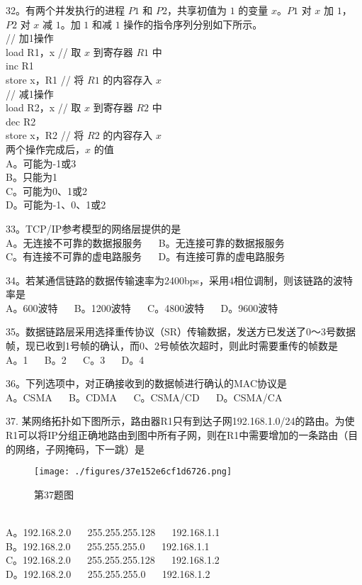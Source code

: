32。有两个并发执行的进程 $P1$ 和 $P2$，共享初值为 $1$ 的变量 $x$。$P1$ 对 $x$ 加 $1$，$P2$ 对 $x$ 减 $1$。加 $1$ 和减 $1$ 操作的指令序列分别如下所示。 \\

// 加1操作 \\
load R1，x  // 取 $x$ 到寄存器 $R1$ 中 \\
inc R1 \\
store x，R1  // 将 $R1$ 的内容存入 $x$ \\

// 减1操作 \\
load R2，x // 取 $x$ 到寄存器 $R2$ 中 \\
dec R2 \\
store x，R2 // 将 $R2$ 的内容存入 $x$ \\

两个操作完成后，$x$ 的值 \\
A。可能为-1或3 \\
B。只能为1 \\
C。可能为0、1或2 \\
D。可能为-1、0、1或2

33。TCP/IP参考模型的网络层提供的是 \\
A。无连接不可靠的数据报服务 $\quad$ B。无连接可靠的数据报服务 \\
C。有连接不可靠的虚电路服务 $\quad$ D。有连接可靠的虚电路服务

34。若某通信链路的数据传输速率为2400bps，采用4相位调制，则该链路的波特率是 \\
A。600波特 $\quad$ B。1200波特 $\quad$ C。4800波特 $\quad$ D。9600波特

35。数据链路层采用选择重传协议（SR）传输数据，发送方已发送了0～3号数据帧，现已收到1号帧的确认，而0、2号帧依次超时，则此时需要重传的帧数是 \\
A。1 $\quad$ B。2 $\quad$ C。3 $\quad$ D。4

36。下列选项中，对正确接收到的数据帧进行确认的MAC协议是 \\
A。CSMA $\quad$ B。CDMA $\quad$ C。CSMA/CD $\quad$ D。CSMA/CA

37. 某网络拓扑如下图所示，路由器R1只有到达子网192.168.1.0/24的路由。为使R1可以将IP分组正确地路由到图中所有子网，则在R1中需要增加的一条路由（目的网络，子网掩码，下一跳）是 \\
\begin{figure}[ht]
\centering
\texttt{[image: ./figures/37e152e6cf1d6726.png]}
\caption{第37题图} \label{fig_Na11_1}
\end{figure}
\\
A。192.168.2.0 $\quad$ 255.255.255.128 $\quad$ 192.168.1.1 \\
B。192.168.2.0 $\quad$ 255.255.255.0 $\quad$ 192.168.1.1 \\
C。192.168.2.0 $\quad$ 255.255.255.128 $\quad$ 192.168.1.2 \\
D。192.168.2.0 $\quad$ 255.255.255.0 $\quad$ 192.168.1.2 \\


